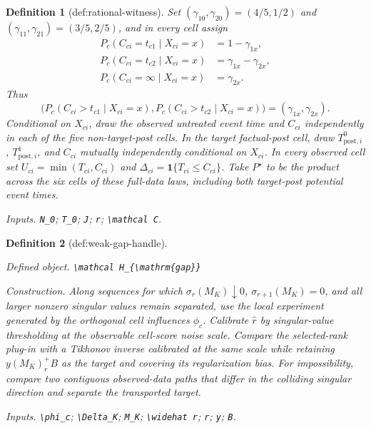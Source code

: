\documentclass{article}
\newtheorem{definition}{Definition}
\begin{document}
\begin{definition}[def:rational-witness]
Set \((\gamma_{10},\gamma_{20})=(4/5,1/2)\) and \((\gamma_{11},\gamma_{21})=(3/5,2/5)\), and in every cell assign
\[
\begin{aligned}
P_c(C_{ci}=t_{c1}\mid X_{ci}=x)&=1-\gamma_{1x},\\
P_c(C_{ci}=t_{c2}\mid X_{ci}=x)&=\gamma_{1x}-\gamma_{2x},\\
P_c(C_{ci}=\infty\mid X_{ci}=x)&=\gamma_{2x}.
\end{aligned}
\]
Thus
\[
\bigl(P_c(C_{ci}>t_{c1}\mid X_{ci}=x),
P_c(C_{ci}>t_{c2}\mid X_{ci}=x)\bigr)
=(\gamma_{1x},\gamma_{2x}).
\]
Conditional on \(X_{ci}\), draw the observed untreated event time and \(C_{ci}\) independently in each of the five non-target-post cells.  In the target factual-post cell, draw \(T^{0}_{\mathrm{post},i}\), \(T^{1}_{\mathrm{post},i}\), and \(C_{ci}\) mutually independently conditional on \(X_{ci}\).  In every observed cell set \(U_{ci}=\min(T_{ci},C_{ci})\) and \(\Delta_{ci}=\mathbf 1\{T_{ci}\le C_{ci}\}\).  Take \(P^\star\) to be the product across the six cells of these full-data laws, including both target-post potential event times.
\par\smallskip\noindent\emph{Inputs.} \texttt{N\_\allowbreak{}0}; \texttt{T\_\allowbreak{}0}; \texttt{J}; \texttt{r}; \texttt{\textbackslash{}\allowbreak{}mathcal C}.
\end{definition}

\begin{definition}[def:weak-gap-handle]\label{def:weak-gap-handle}
\par\smallskip\noindent\emph{Defined object.} \texttt{\textbackslash{}\allowbreak{}mathcal H\_\allowbreak{}\{\textbackslash{}\allowbreak{}mathrm\{gap\}\allowbreak{}\}\allowbreak{}}
\par\smallskip\noindent\emph{Construction.} Along sequences for which \(\sigma_r(M_K)\downarrow0\), \(\sigma_{r+1}(M_K)=0\), and all larger nonzero singular values remain separated, use the local experiment generated by the orthogonal cell influences \(\phi_c\). Calibrate \(\widehat r\) by singular-value thresholding at the observable cell-score noise scale. Compare the selected-rank plug-in with a Tikhonov inverse calibrated at the same scale while retaining \(y(M_K)_r^+B\) as the target and covering its regularization bias. For impossibility, compare two contiguous observed-data paths that differ in the colliding singular direction and separate the transported target.
\par\smallskip\noindent\emph{Inputs.} \texttt{\textbackslash{}\allowbreak{}phi\_\allowbreak{}c}; \texttt{\textbackslash{}\allowbreak{}Delta\_\allowbreak{}K}; \texttt{M\_\allowbreak{}K}; \texttt{\textbackslash{}\allowbreak{}widehat r}; \texttt{r}; \texttt{y}; \texttt{B}.
\end{definition}
\end{document}

